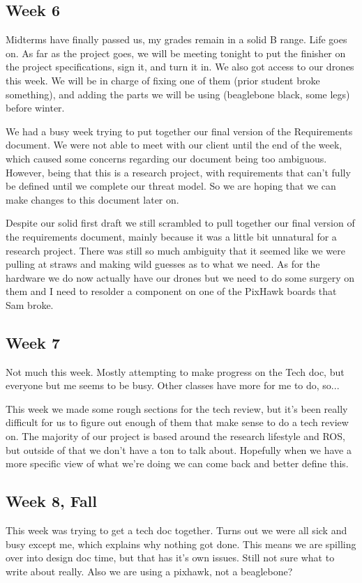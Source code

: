 \documentclass[IEEEtran,letterpaper,10pt,notitlepage,draftclsnofoot,onecolumn]{article}
\begin{document}
\subsection{Week 6}
Midterms have finally passed us, my grades remain in a solid B range. Life goes on. As far as the project goes, we will be meeting tonight to put the finisher on the project specifications, sign it, and turn it in. We also got access to our drones this week. We will be in charge of fixing one of them (prior student broke something), and adding the parts we will be using (beaglebone black, some legs) before winter.

We had a busy week trying to put together our final version of the Requirements document. We were not able to meet with our client until the end of the week, which caused some concerns regarding our document being too ambiguous. However, being that this is a research project, with requirements that can't fully be defined until we complete our threat model. So we are hoping that we can make changes to this document later on.

Despite our solid first draft we still scrambled to pull together our final version of the requirements document, mainly because it was a little bit unnatural for a research project. There was still so much ambiguity that it seemed like we were pulling at straws and making wild guesses as to what we need. As for the hardware we do now actually have our drones but we need to do some surgery on them and I need to resolder a component on one of the PixHawk boards that Sam broke.

\subsection{Week 7}
Not much this week. Mostly attempting to make progress on the Tech doc, but everyone but me seems to be busy. Other 
classes have more for me to do, so...

This week we made some rough sections for the tech review, but it's been really difficult for us to figure out enough of them that make sense to do a tech review on. The majority of our project is based around the research lifestyle and ROS, but outside of that we don't have a ton to talk about. Hopefully when we have a more specific view of what we're doing we can come back and better define this.

\subsection{Week 8, Fall}
This week was trying to get a tech doc together. Turns out we were all sick and busy except me, which explains why 
nothing got done. This means we are spilling over into design doc time, but that has it's own issues. Still not sure what to write about really. Also we are using a pixhawk, not a beaglebone? 
\end{document}
